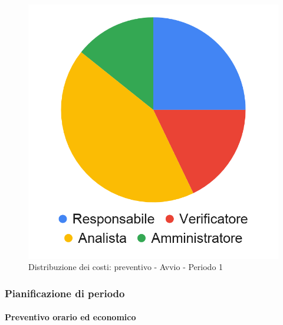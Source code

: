 \hspace{-1cm}
\begin{minipage}{0.60\textwidth}
	\smallPreventivoTable{	
}
\end{minipage}
\begin{minipage}{.40\textwidth}
\begin{figure}[H]
	\includegraphics[scale=0.21]{res/images/charts/preventivo_priori/Grafico4-0.png}
	\caption{Distribuzione dei costi: preventivo - Avvio - Periodo 1}
\end{figure}
\end{minipage} 


\subsubsection{Pianificazione di periodo}

\paragraph{Preventivo orario ed economico}
\subparagraph*{}

\contabilitaTable{
	
}

